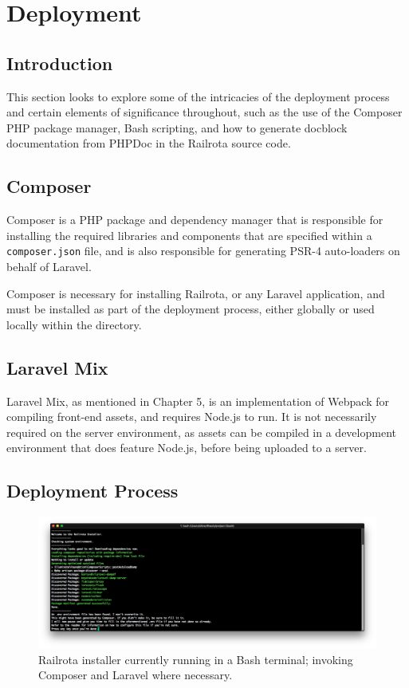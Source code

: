 \chapter{Deployment}

\section{Introduction}
This section looks to explore some of the intricacies of the deployment process and certain elements of significance throughout, such as the use of the Composer PHP package manager, Bash scripting, and how to generate docblock documentation from PHPDoc in the Railrota source code.

\section{Composer}
Composer is a PHP package and dependency manager that is responsible for installing the required libraries and components that are specified within a \texttt{composer.json} file, and is also responsible for generating PSR-4 auto-loaders on behalf of Laravel. \cite{Composer1} \cite{PSR1}

Composer is necessary for installing Railrota, or any Laravel application, and must be installed as part of the deployment process, either globally or used locally within the directory.

\section{Laravel Mix}
Laravel Mix, as mentioned in Chapter 5, is an implementation of Webpack for compiling front-end assets, and requires Node.js to run. It is not necessarily required on the server environment, as assets can be compiled in a development environment that does feature Node.js, before being uploaded to a server. \cite{Laravel2}

\section{Deployment Process}

\begin{figure}[!ht]
    \includegraphics[width=\textwidth]{Figures/installer}
    \caption{Railrota installer currently running in a Bash terminal; invoking Composer and Laravel where necessary.}
    \label{fig:installer}
\end{figure}

